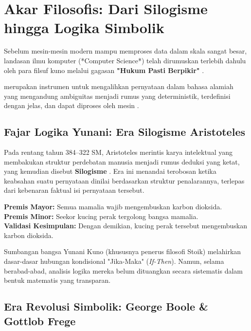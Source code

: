 \section{Akar Filosofis: Dari Silogisme hingga Logika Simbolik}

Sebelum mesin-mesin modern mampu memproses data dalam skala sangat besar, landasan ilmu komputer (*Computer Science*) telah dirumuskan terlebih dahulu oleh para filsuf kuno melalui gagasan \textbf{"Hukum Pasti Berpikir"} \cite{wiki_proplogic}.

 merupakan instrumen untuk mengalihkan pernyataan dalam bahasa alamiah yang mengandung ambiguitas menjadi rumus yang deterministik, terdefinisi dengan jelas, dan dapat diproses oleh mesin \cite{rosen2019,copi2014,forallx}.

\subsection{Fajar Logika Yunani: Era Silogisme Aristoteles}

Pada rentang tahun 384--322 SM, Aristoteles merintis karya intelektual yang membakukan struktur perdebatan manusia menjadi rumus deduksi yang ketat, yang kemudian disebut \textbf{Silogisme} \cite{iep_logic_history}. Era ini menandai terobosan ketika keabsahan suatu pernyataan dinilai berdasarkan struktur penalarannya, terlepas dari kebenaran faktual isi pernyataan tersebut.

\begin{contoh}
\indent \textbf{Premis Mayor:} Semua mamalia wajib mengembuskan karbon dioksida. \\
\indent \textbf{Premis Minor:} Seekor kucing perak tergolong bangsa mamalia. \\
\indent \textbf{Validasi Kesimpulan:} Dengan demikian, kucing perak tersebut mengembuskan karbon dioksida.
\end{contoh}

Sumbangan bangsa Yunani Kuno (khususnya penerus filosofi Stoik) melahirkan dasar-dasar hubungan kondisional "Jika-Maka" (\textit{If-Then}). Namun, selama berabad-abad, analisis logika mereka belum dituangkan secara sistematis dalam bentuk matematis yang transparan.

\subsection{Era Revolusi Simbolik: George Boole \& Gottlob Frege}

